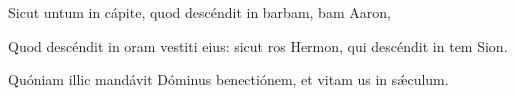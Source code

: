 \item {}

\item Sicut untum in cápite,\psstar{} quod descéndit in barbam, bam Aaron,

\item Quod descéndit in oram vestiti eius:\psstar{} sicut ros Hermon, qui descéndit in tem Sion.

\item Quóniam illic mandávit Dóminus benectiónem,\psstar{} et vitam us in sǽculum.
